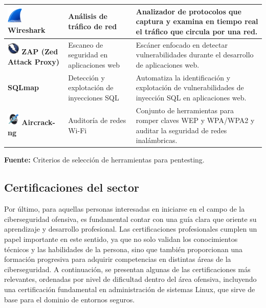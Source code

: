 \documentclass[a4paper, 10pt]{article}
\begin{document}
\begin{table}[H]
\begin{tabular}{|m{5cm}|m{3.5cm}|m{8cm}|}
    \hline
    \includegraphics[width=0.75cm]{images/wireshark.png} \textbf{Wireshark} & Análisis de tráfico de red & Analizador de protocolos que captura y examina en tiempo real el tráfico que circula por una red. \\
    \hline
    \includegraphics[width=0.6cm]{images/zap.jpeg} \textbf{ZAP (Zed Attack Proxy)} & Escaneo de seguridad en aplicaciones web & Escáner enfocado en detectar vulnerabilidades durante el desarrollo de aplicaciones web. \\
    \hline
    \textbf{SQLmap} & Detección y explotación de inyecciones SQL & Automatiza la identificación y explotación de vulnerabilidades de inyección SQL en aplicaciones web. \\
    \hline
    \includegraphics[width=0.6cm]{images/aircrack.jpeg} \textbf{Aircrack-ng} & Auditoría de redes Wi-Fi & Conjunto de herramientas para romper claves WEP y WPA/WPA2 y auditar la seguridad de redes inalámbricas. \\
    \hline
\end{tabular}
\begin{flushleft}\centering
    \footnotesize \textbf{Fuente:} Criterios de selección de herramientas para pentesting. \cite{felipe2024}
\end{flushleft}
\end{table}

    
    

\subsection{Certificaciones del sector}

Por último, para aquellas personas interesadas en iniciarse en el campo de la ciberseguridad ofensiva, 
es fundamental contar con una guía clara que oriente su aprendizaje y desarrollo profesional. Las certificaciones 
profesionales cumplen un papel importante en este sentido, ya que no solo validan los conocimientos técnicos y las habilidades de la persona, sino que también proporcionan una formación progresiva para adquirir competencias en distintas áreas de la ciberseguridad. A continuación, se presentan algunas de las certificaciones más relevantes, ordenadas por nivel de dificultad dentro del área ofensiva, incluyendo una certificación fundamental en administración de sistemas Linux, que sirve de base para el dominio de entornos seguros.
\end{document}
